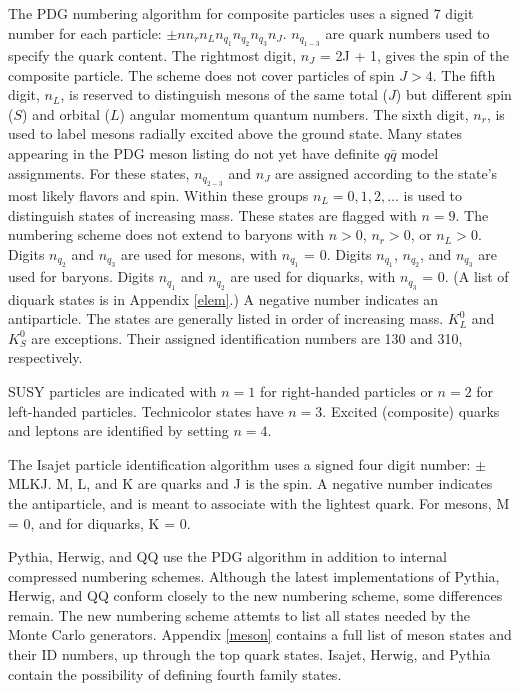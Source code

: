 The PDG numbering algorithm for composite particles uses a 
signed 7 digit number for each particle:  $\pm nn_rn_Ln_{q_1}n_{q_2}n_{q_3}n_J$.
$n_{q_{1-3}}$ are quark numbers used to specify the quark content.
The rightmost digit, $n_J$ = 2J + 1, gives the spin of the composite particle.
The scheme does not cover particles of spin $J>4$.
The fifth digit, $n_L$, is reserved to distinguish mesons of the
same total ($J$) but different spin ($S$) and orbital ($L$)
angular momentum quantum numbers.
The sixth digit, $n_r$, is used to label mesons radially excited
above the ground state.
Many states appearing in the PDG meson listing do not yet have definite
$q\bar q$ model assignments.  For these states, $n_{q_{2-3}}$
and $n_J$ are assigned according to the state's most likely flavors
and spin.  Within these groups $n_L=0,1,2,\dots$ is used to distinguish
states of increasing mass. These states are flagged with $n=9$.
The numbering scheme does not extend to baryons with $n>0$, $n_r>0$, or $n_L>0$.
Digits $n_{q_2}$ and $n_{q_3}$ are used for mesons, with $n_{q_1}$ = 0.
Digits $n_{q_1}$, $n_{q_2}$, and $n_{q_3}$ are used for baryons.
Digits $n_{q_1}$ and $n_{q_2}$ are used for diquarks, with $n_{q_3}$ = 0. 
(A list of diquark states is in Appendix \ref{elem}.)  A negative number
indicates an antiparticle.  The states are generally listed in order of
increasing mass.  $K_L^0$ and $K_S^0$ are exceptions.  Their assigned
identification numbers are 130 and 310, respectively.

SUSY particles are indicated with $n=1$ for right-handed particles or $n=2$
for left-handed particles.  Technicolor states have $n=3$.
Excited (composite) quarks and leptons are identified by setting $n=4$.

The Isajet particle identification algorithm uses a signed four digit
number: $\pm$MLKJ.  M, L, and K are quarks and J is the spin.  A negative
number indicates the antiparticle, and is meant to associate with the
lightest quark.  For mesons, M = 0, and for diquarks, K = 0.

Pythia, Herwig, and QQ use the PDG algorithm in addition to internal
compressed numbering schemes.
Although the latest implementations of Pythia, Herwig, and QQ conform closely
to the new numbering scheme, some differences remain.
The new numbering scheme attemts to list all states needed by the
Monte Carlo generators.  Appendix \ref{meson}
contains a full list of meson states and their ID numbers, up through the
top quark states.  Isajet, Herwig, and Pythia contain the possibility of
defining fourth family states.  

